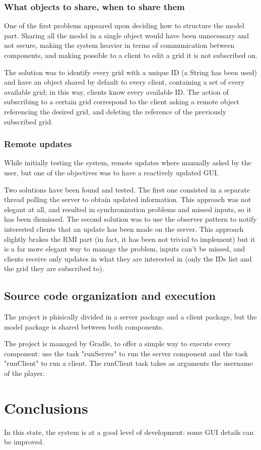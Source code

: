 \documentclass[12pt, a4paper]{report}
\begin{document}
\subsection{What objects to share, when to share them}
One of the first problems appeared upon deciding how to structure the model
 part. Sharing all the model in a single object would have been unnecessary
 and not secure, making the system heavier in terms of communication between
 components, and making possible to a client to edit a grid it is not
 subscribed on.

The solution was to identify every grid with a unique ID (a String has been
 used) and have an object shared by default to every client, containing a set
 of every available grid; in this way, clients know every available ID. The
 action of subscribing to a certain grid correspond to the client asking a
 remote object referencing the desired grid, and deleting the reference of the
 previously subscribed grid.

\subsection{Remote updates}
While initially testing the system, remote updates where manually asked by the
 user, but one of the objectives was to have a reactively updated GUI.

Two solutions have been found and tested. The first one consisted in a separate
 thread polling the server to obtain updated information. This approach was not
 elegant at all, and resulted in synchronization problems and missed inputs, so
 it has been dismissed. The second solution was to use the observer pattern to
 notify interested clients that an update has been made on the server. This
 approach slightly brakes the RMI part (in fact, it has been not trivial to
 implement) but it is a far more elegant way to manage the problem, inputs
 can't be missed, and clients receive only updates in what they are interested
 in (only the IDs list and the grid they are subscribed to).

\section{Source code organization and execution}
The project is phisically divided in a server package and a client package, but
 the model package is shared between both components.

The project is managed by Gradle, to offer a simple way to execute every
 component: use the task "runServer" to run the server component and the task
 "runClient" to run a client. The runClient task takes as  arguments the
 username of the player.

\chapter{Conclusions}
In this state, the system is at a good level of development: some GUI details
 can be improved.



\end{document}
